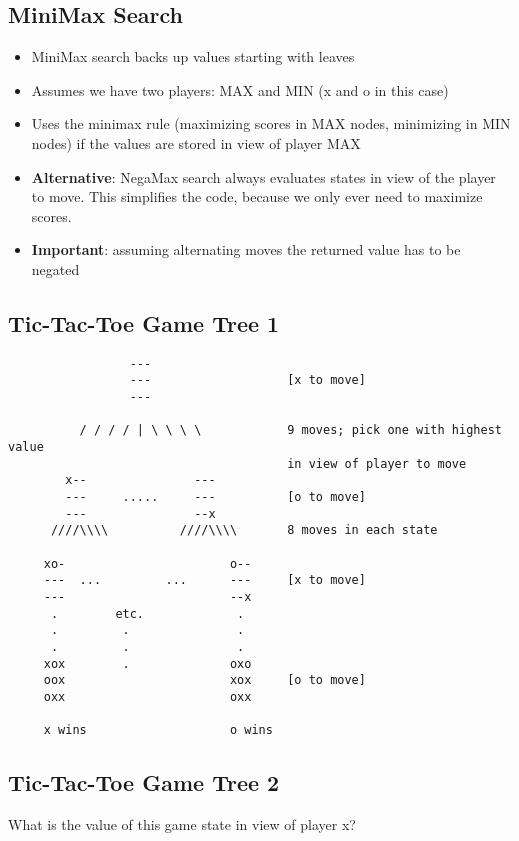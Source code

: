 \documentclass[a4paper,11pt]{article}
\begin{document}
\subsection*{MiniMax Search}
\begin{itemize}
    \item MiniMax search backs up values starting with leaves
    \item Assumes we have two players: MAX and MIN (x and o in this case)
    \item Uses the minimax rule (maximizing scores in MAX nodes, minimizing in MIN
         nodes) if the values are stored in view of player MAX
    \item \textbf{Alternative}: NegaMax search always evaluates states in view of the player
    to move. This simplifies the code, because we only ever need to maximize
    scores. 
    \item \textbf{Important}: assuming alternating moves the returned value has to be
    negated
\end{itemize}

\subsection*{Tic-Tac-Toe Game Tree 1}
{\small
\begin{verbatim}
                 ---
                 ---                   [x to move]
                 ---
    
          / / / / | \ \ \ \            9 moves; pick one with highest value
                                       in view of player to move
        x--               ---
        ---     .....     ---          [o to move]
        ---               --x
      ////\\\\          ////\\\\       8 moves in each state
     
     xo-                       o--
     ---  ...         ...      ---     [x to move]
     ---                       --x
      .        etc.             .
      .         .               .
      .         .               .
     xox        .              oxo
     oox                       xox     [o to move]
     oxx                       oxx
    
     x wins                    o wins    
\end{verbatim}
}

\subsection*{Tic-Tac-Toe Game Tree 2}
What is the value of this game state in view of player x?
\end{document}
